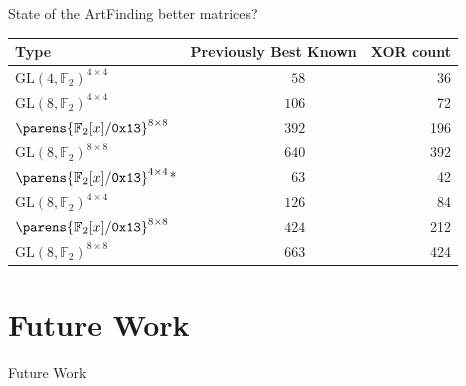 \begin{frame}{State of the Art}{Finding better matrices?}
    \centering
    \begin{tabular}{lrlr}
        \toprule
        Type                                                    & \multicolumn{2}{c}{Previously Best Known} &  XOR count \\
        \midrule
        ${\mathrm{GL}(4, \mathbb{F}_2)}^{4 \times 4}$           &  $58$ & \cite{ToSC:SarSye16,EPRINT:JeaPeySim17} &  36  \\ \rowcolor{gray!10}
        ${\mathrm{GL}(8, \mathbb{F}_2)}^{4 \times 4}$           & $106$ & \cite{FSE:LiWan16}                &        72  \\
        $\parens{\mathbb{F}_2[x]/\mathtt{0x 13}}^{8 \times 8}$  & $392$ & \cite{FSE:SKOP15}                 &       196  \\ \rowcolor{gray!10}
        ${\mathrm{GL}(8, \mathbb{F}_2)}^{8 \times 8}$           & $640$ & \cite{FSE:LiuSim16}               &       392  \\
        \midrule
        $\parens{\mathbb{F}_2[x]/\mathtt{0x 13}}^{4 \times 4}$* &  $63$ & \cite{EPRINT:JeaPeySim17}         &        42  \\ \rowcolor{gray!10}
        ${\mathrm{GL}(8, \mathbb{F}_2)}^{4 \times 4}$           & $126$ & \cite{EPRINT:JeaPeySim17}         &        84  \\
        $\parens{\mathbb{F}_2[x]/\mathtt{0x 13}}^{8 \times 8}$  & $424$ & \cite{FSE:SKOP15}                 &       212  \\ \rowcolor{gray!10}
        ${\mathrm{GL}(8, \mathbb{F}_2)}^{8 \times 8}$           & $663$ & \cite{EPRINT:JeaPeySim17}         &       424  \\
        \bottomrule
    \end{tabular}
\end{frame}

\section{Future Work}
\begin{frame}{Future Work}{}
\end{frame}
